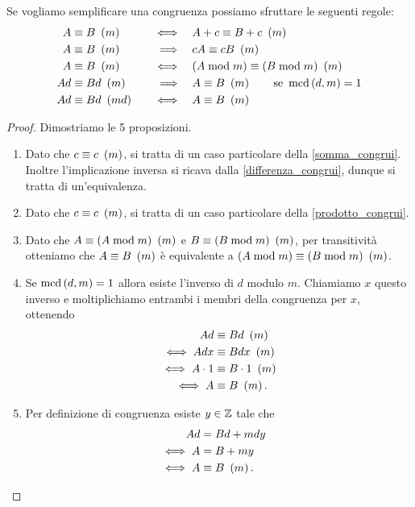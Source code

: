 \begin{proposition}
    Se vogliamo semplificare una congruenza possiamo sfruttare le seguenti regole:
    \begin{alignat}{3}
        A &\equiv B \ \left(m\right) \quad &\iff      \quad &A + c \equiv B + c \ \left(m\right) \\
        A &\equiv B \ \left(m\right) \quad &\implies  \quad &cA \equiv cB \ \left(m\right) \\
        A &\equiv B \ \left(m\right) \quad &\iff      \quad &(A \bmod m) \equiv (B \bmod m) \ \left(m\right) \\
        Ad &\equiv Bd \ \left(m\right) \quad &\implies\quad &A \equiv B \ \left(m\right) \qquad \text{se }\operatorname{mcd}\left(d, m\right) = 1\\
        Ad &\equiv Bd \ \left(md\right) \quad &\iff   \quad &A \equiv B \ \left(m\right)
    \end{alignat}
\end{proposition}
\begin{proof}
    Dimostriamo le 5 proposizioni.
    \begin{enumerate}
        \item Dato che $c \equiv c \ \left(m\right)$, si tratta di un caso particolare della \ref{somma_congrui}. Inoltre l'implicazione inversa si ricava dalla \ref{differenza_congrui}, dunque si tratta di un'equivalenza.
        \item Dato che $c \equiv c \ \left(m\right)$, si tratta di un caso particolare della \ref{prodotto_congrui}.
        \item Dato che $A \equiv (A \bmod m) \ \left(m\right)$ e $B \equiv (B \bmod m) \ \left(m\right)$, per transitività otteniamo che $A \equiv B \ \left(m\right)$ è equivalente a $(A \bmod m) \equiv (B \bmod m) \ \left(m\right)$.
        \item Se $\operatorname{mcd}\left(d, m\right) = 1$ allora esiste l'inverso di $d$ modulo $m$. Chiamiamo $x$ questo inverso e moltiplichiamo entrambi i membri della congruenza per $x$, ottenendo
        \begin{alignat*}
            {1}
            Ad &\equiv Bd \ \left(m\right)  \\
            \iff Adx &\equiv Bdx \ \left(m\right) \\
            \iff A \cdot 1 &\equiv B \cdot 1 \ \left(m\right) \\
            \iff A &\equiv B \ \left(m\right).
        \end{alignat*}
        \item Per definizione di congruenza esiste $y \in \mathbb{Z}$ tale che
        \begin{alignat*}
            {1}
            Ad &= Bd + mdy \\
            \iff A &= B + my \\
            \iff A &\equiv B \ \left(m\right). \tag*{\qedhere}
        \end{alignat*}
    \end{enumerate}
\end{proof}

